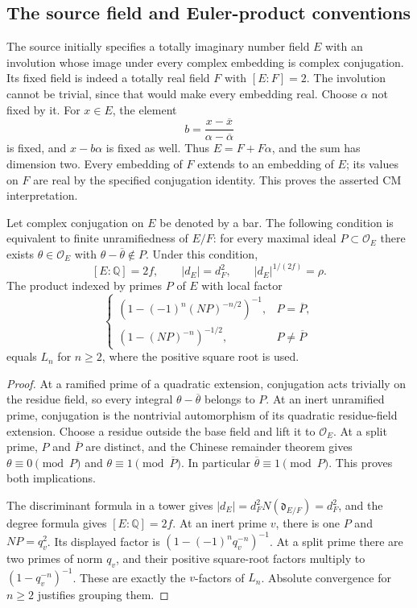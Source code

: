 \subsection{The source field and Euler-product conventions}

The source initially specifies a totally imaginary number field $E$
with an involution whose image under every complex embedding is complex
conjugation. Its fixed field is indeed a totally real field $F$ with
$[E:F]=2$. The involution cannot be trivial, since that would make
every embedding real. Choose $\alpha$ not fixed by it. For $x\in E$,
the element
\[
 b=\frac{x-\overline x}{\alpha-\overline\alpha}
\]
is fixed, and $x-b\alpha$ is fixed as well. Thus $E=F+F\alpha$,
and the sum has dimension two. Every embedding of $F$ extends to
an embedding of $E$; its values on $F$ are real by the specified
conjugation identity. This proves the asserted CM interpretation.

\begin{proposition}\label{md-source-conventions}
Let complex conjugation on $E$ be denoted by a bar.
The following condition is equivalent to finite unramifiedness
of $E/F$:
for every maximal ideal $P\subset\mathcal O_E$ there exists
$\theta\in\mathcal O_E$ with $\theta-\overline\theta\notin P$.
Under this condition,
\[
 [E:\mathbb Q]=2f,\qquad |d_E|=d_F^2,
 \qquad |d_E|^{1/(2f)}=\rho.
\]
The product indexed by primes $P$ of $E$ with local factor
\[
 \begin{cases}
 (1-(-1)^n(NP)^{-n/2})^{-1},&P=\overline P,\\
 (1-(NP)^{-n})^{-1/2},&P\ne\overline P
 \end{cases}
\]
equals $L_n$ for $n\geq2$, where the positive square root is used.
\end{proposition}

\begin{proof}
At a ramified prime of a quadratic extension, conjugation acts
trivially on the residue field, so every integral
$\theta-\overline\theta$ belongs to $P$.
At an inert unramified prime, conjugation is the nontrivial
automorphism of its quadratic residue-field extension. Choose
a residue outside the base field and lift it to $\mathcal O_E$.
At a split prime, $P$ and $\overline P$ are distinct, and the
Chinese remainder theorem gives $\theta\equiv0\pmod P$ and
$\theta\equiv1\pmod{\overline P}$. In particular
$\overline\theta\equiv1\pmod P$. This proves both implications.

The discriminant formula in a tower gives
$|d_E|=d_F^2N(\mathfrak d_{E/F})=d_F^2$, and the degree
formula gives $[E:\mathbb Q]=2f$.
At an inert prime $v$, there is one $P$ and $NP=q_v^2$.
Its displayed factor is $(1-(-1)^nq_v^{-n})^{-1}$.
At a split prime there are two primes of norm $q_v$, and
their positive square-root factors multiply to
$(1-q_v^{-n})^{-1}$. These are exactly the $v$-factors of $L_n$.
Absolute convergence for $n\geq2$ justifies grouping them.
\end{proof}

